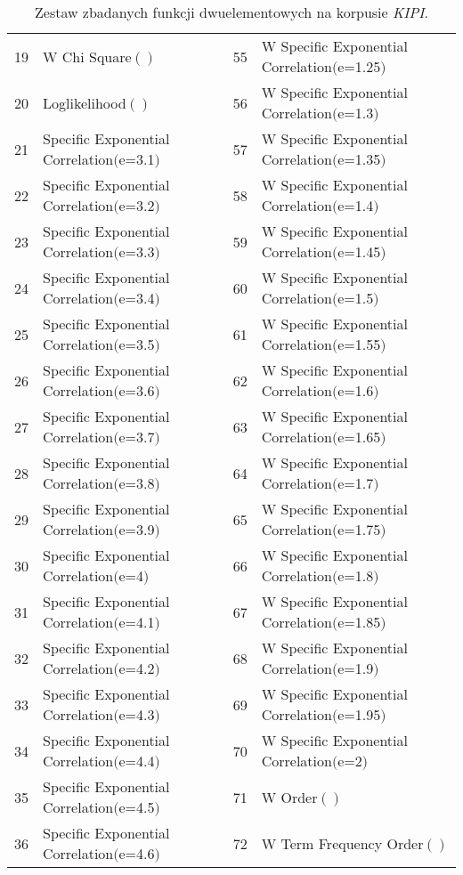 \begin{table}[h!]
\begin{tabular}{ l | l || l | l }
	19	&	W Chi Square$()$								& 55	&	W Specific Exponential Correlation$($e=1.25$)$	\\
	20	&	Loglikelihood$()$								& 56	&	W Specific Exponential Correlation$($e=1.3$)$	\\
	21	&	Specific Exponential Correlation$($e=3.1$)$		& 57	&	W Specific Exponential Correlation$($e=1.35$)$	\\
	22	&	Specific Exponential Correlation$($e=3.2$)$		& 58	&	W Specific Exponential Correlation$($e=1.4$)$	\\
	23	&	Specific Exponential Correlation$($e=3.3$)$		& 59	&	W Specific Exponential Correlation$($e=1.45$)$	\\
	24	&	Specific Exponential Correlation$($e=3.4$)$		& 60	&	W Specific Exponential Correlation$($e=1.5$)$	\\
	25	&	Specific Exponential Correlation$($e=3.5$)$		& 61	&	W Specific Exponential Correlation$($e=1.55$)$	\\
	26	&	Specific Exponential Correlation$($e=3.6$)$		& 62	&	W Specific Exponential Correlation$($e=1.6$)$	\\
	27	&	Specific Exponential Correlation$($e=3.7$)$		& 63	&	W Specific Exponential Correlation$($e=1.65$)$	\\
	28	&	Specific Exponential Correlation$($e=3.8$)$		& 64	&	W Specific Exponential Correlation$($e=1.7$)$	\\
	29	&	Specific Exponential Correlation$($e=3.9$)$		& 65	&	W Specific Exponential Correlation$($e=1.75$)$	\\
	30	&	Specific Exponential Correlation$($e=4$)$		& 66	&	W Specific Exponential Correlation$($e=1.8$)$	\\
	31	&	Specific Exponential Correlation$($e=4.1$)$		& 67	&	W Specific Exponential Correlation$($e=1.85$)$	\\
	32	&	Specific Exponential Correlation$($e=4.2$)$		& 68	&	W Specific Exponential Correlation$($e=1.9$)$	\\
	33	&	Specific Exponential Correlation$($e=4.3$)$		& 69	&	W Specific Exponential Correlation$($e=1.95$)$	\\
	34	&	Specific Exponential Correlation$($e=4.4$)$		& 70	&	W Specific Exponential Correlation$($e=2$)$		\\
	35	&	Specific Exponential Correlation$($e=4.5$)$		& 71	&	W Order$()$										\\
	36	&	Specific Exponential Correlation$($e=4.6$)$		& 72	&	W Term Frequency Order$()$						\\
	\bottomrule
\end{tabular}
\caption[Zestaw zbadanych funkcji dwuelementowych na korpusie \emph{KIPI}]{Zestaw zbadanych funkcji dwuelementowych na korpusie \emph{KIPI}.}
\label{KIPI_2_function_set}
\end{table}


